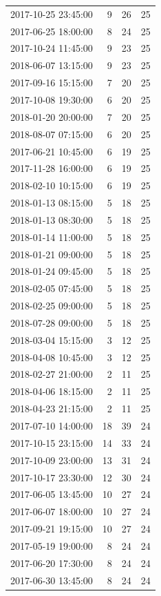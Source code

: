 \begin{tabular}{lrrr}
2017-10-25 23:45:00 & 9 & 26 & 25 \\
2017-06-25 18:00:00 & 8 & 24 & 25 \\
2017-10-24 11:45:00 & 9 & 23 & 25 \\
2018-06-07 13:15:00 & 9 & 23 & 25 \\
2017-09-16 15:15:00 & 7 & 20 & 25 \\
2017-10-08 19:30:00 & 6 & 20 & 25 \\
2018-01-20 20:00:00 & 7 & 20 & 25 \\
2018-08-07 07:15:00 & 6 & 20 & 25 \\
2017-06-21 10:45:00 & 6 & 19 & 25 \\
2017-11-28 16:00:00 & 6 & 19 & 25 \\
2018-02-10 10:15:00 & 6 & 19 & 25 \\
2018-01-13 08:15:00 & 5 & 18 & 25 \\
2018-01-13 08:30:00 & 5 & 18 & 25 \\
2018-01-14 11:00:00 & 5 & 18 & 25 \\
2018-01-21 09:00:00 & 5 & 18 & 25 \\
2018-01-24 09:45:00 & 5 & 18 & 25 \\
2018-02-05 07:45:00 & 5 & 18 & 25 \\
2018-02-25 09:00:00 & 5 & 18 & 25 \\
2018-07-28 09:00:00 & 5 & 18 & 25 \\
2018-03-04 15:15:00 & 3 & 12 & 25 \\
2018-04-08 10:45:00 & 3 & 12 & 25 \\
2018-02-27 21:00:00 & 2 & 11 & 25 \\
2018-04-06 18:15:00 & 2 & 11 & 25 \\
2018-04-23 21:15:00 & 2 & 11 & 25 \\
2017-07-10 14:00:00 & 18 & 39 & 24 \\
2017-10-15 23:15:00 & 14 & 33 & 24 \\
2017-10-09 23:00:00 & 13 & 31 & 24 \\
2017-10-17 23:30:00 & 12 & 30 & 24 \\
2017-06-05 13:45:00 & 10 & 27 & 24 \\
2017-06-07 18:00:00 & 10 & 27 & 24 \\
2017-09-21 19:15:00 & 10 & 27 & 24 \\
2017-05-19 19:00:00 & 8 & 24 & 24 \\
2017-06-20 17:30:00 & 8 & 24 & 24 \\
2017-06-30 13:45:00 & 8 & 24 & 24 \\

\end{tabular}
